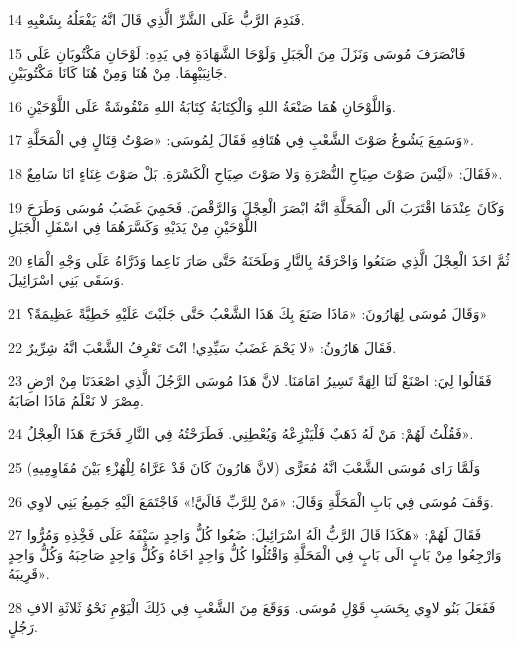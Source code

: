 \par 14 فَنَدِمَ الرَّبُّ عَلَى الشَّرِّ الَّذِي قَالَ انَّهُ يَفْعَلُهُ بِشَعْبِهِ.
\par 15 فَانْصَرَفَ مُوسَى وَنَزَلَ مِنَ الْجَبَلِ وَلَوْحَا الشَّهَادَةِ فِي يَدِهِ: لَوْحَانِ مَكْتُوبَانِ عَلَى جَانِبَيْهِمَا. مِنْ هُنَا وَمِنْ هُنَا كَانَا مَكْتُوبَيْنِ.
\par 16 وَاللَّوْحَانِ هُمَا صَنْعَةُ اللهِ وَالْكِتَابَةُ كِتَابَةُ اللهِ مَنْقُوشَةٌ عَلَى اللَّوْحَيْنِ.
\par 17 وَسَمِعَ يَشُوعُ صَوْتَ الشَّعْبِ فِي هُتَافِهِ فَقَالَ لِمُوسَى: «صَوْتُ قِتَالٍ فِي الْمَحَلَّةِ».
\par 18 فَقَالَ: «لَيْسَ صَوْتَ صِيَاحِ النُّصْرَةِ وَلا صَوْتَ صِيَاحِ الْكَسْرَةِ. بَلْ صَوْتَ غِنَاءٍ انَا سَامِعٌ».
\par 19 وَكَانَ عِنْدَمَا اقْتَرَبَ الَى الْمَحَلَّةِ انَّهُ ابْصَرَ الْعِجْلَ وَالرَّقْصَ. فَحَمِيَ غَضَبُ مُوسَى وَطَرَحَ اللَّوْحَيْنِ مِنْ يَدَيْهِ وَكَسَّرَهُمَا فِي اسْفَلِ الْجَبَلِ
\par 20 ثُمَّ اخَذَ الْعِجْلَ الَّذِي صَنَعُوا وَاحْرَقَهُ بِالنَّارِ وَطَحَنَهُ حَتَّى صَارَ نَاعِما وَذَرَّاهُ عَلَى وَجْهِ الْمَاءِ وَسَقَى بَنِي اسْرَائِيلَ.
\par 21 وَقَالَ مُوسَى لِهَارُونَ: «مَاذَا صَنَعَ بِكَ هَذَا الشَّعْبُ حَتَّى جَلَبْتَ عَلَيْهِ خَطِيَّةً عَظِيمَةً؟»
\par 22 فَقَالَ هَارُونُ: «لا يَحْمَ غَضَبُ سَيِّدِي! انْتَ تَعْرِفُ الشَّعْبَ انَّهُ شِرِّيرٌ.
\par 23 فَقَالُوا لِيَ: اصْنَعْ لَنَا الِهَةً تَسِيرُ امَامَنَا. لانَّ هَذَا مُوسَى الرَّجُلَ الَّذِي اصْعَدَنَا مِنْ ارْضِ مِصْرَ لا نَعْلَمُ مَاذَا اصَابَهُ.
\par 24 فَقُلْتُ لَهُمْ: مَنْ لَهُ ذَهَبٌ فَلْيَنْزِعْهُ وَيُعْطِنِي. فَطَرَحْتُهُ فِي النَّارِ فَخَرَجَ هَذَا الْعِجْلُ».
\par 25 وَلَمَّا رَاى مُوسَى الشَّعْبَ انَّهُ مُعَرًّى (لانَّ هَارُونَ كَانَ قَدْ عَرَّاهُ لِلْهُزْءِ بَيْنَ مُقَاوِمِيهِ)
\par 26 وَقَفَ مُوسَى فِي بَابِ الْمَحَلَّةِ وَقَالَ: «مَنْ لِلرَّبِّ فَالَيَّ!» فَاجْتَمَعَ الَيْهِ جَمِيعُ بَنِي لاوِي.
\par 27 فَقَالَ لَهُمْ: «هَكَذَا قَالَ الرَّبُّ الَهُ اسْرَائِيلَ: ضَعُوا كُلُّ وَاحِدٍ سَيْفَهُ عَلَى فَخِْذِهِ وَمُرُّوا وَارْجِعُوا مِنْ بَابٍ الَى بَابٍ فِي الْمَحَلَّةِ وَاقْتُلُوا كُلُّ وَاحِدٍ اخَاهُ وَكُلُّ وَاحِدٍ صَاحِبَهُ وَكُلُّ وَاحِدٍ قَرِيبَهُ».
\par 28 فَفَعَلَ بَنُو لاوِي بِحَسَبِ قَوْلِ مُوسَى. وَوَقَعَ مِنَ الشَّعْبِ فِي ذَلِكَ الْيَوْمِ نَحْوُ ثَلاثَةِ الافِ رَجُلٍ.
